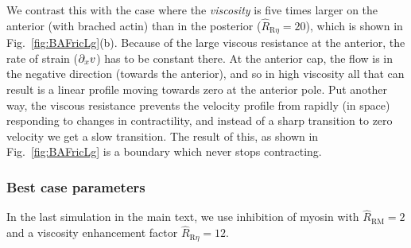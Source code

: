 \documentclass[11pt]{article}
\newcommand{\6}[1]{#1_{\text{6}}}
\newcommand{\3}[1]{#1_{\text{3}}}
\begin{document}
We contrast this with the case where the \emph{viscosity} is five times larger on the anterior (with brached actin) than in the posterior ($\hat R_\text{R$\eta$}=20$), which is shown in Fig.\ \ref{fig:BAFricLg}(b). Because of the large viscous resistance at the anterior, the rate of strain ($\partial_x v$) has to be constant there. At the anterior cap, the flow is in the negative direction (towards the anterior), and so in high viscosity all that can result is a linear profile moving towards zero at the anterior pole. Put another way, the viscous resistance prevents the velocity profile from rapidly (in space) responding to changes in contractility, and instead of a sharp transition to zero velocity we get a slow transition. The result of this, as shown in Fig.\ \ref{fig:BAFricLg} is a boundary which never stops contracting.

\subsubsection{Best case parameters}
In the last simulation in the main text, we use inhibition of myosin with $\hat R_\text{RM}=2$ and a viscosity enhancement factor $\hat R_\text{R$\eta$}=12$.







\end{document}
